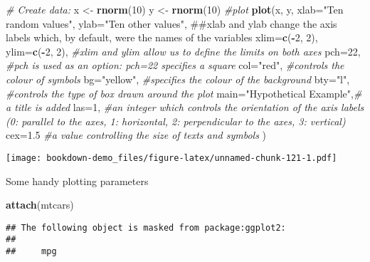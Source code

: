 \documentclass[]{book}
\newenvironment{Shaded}{\begin{snugshade}}{\end{snugshade}}
\newcommand{\KeywordTok}[1]{\textcolor[rgb]{0.13,0.29,0.53}{\textbf{#1}}}
\newcommand{\DataTypeTok}[1]{\textcolor[rgb]{0.13,0.29,0.53}{#1}}
\newcommand{\DecValTok}[1]{\textcolor[rgb]{0.00,0.00,0.81}{#1}}
\newcommand{\FloatTok}[1]{\textcolor[rgb]{0.00,0.00,0.81}{#1}}
\newcommand{\StringTok}[1]{\textcolor[rgb]{0.31,0.60,0.02}{#1}}
\newcommand{\CommentTok}[1]{\textcolor[rgb]{0.56,0.35,0.01}{\textit{#1}}}
\newcommand{\OperatorTok}[1]{\textcolor[rgb]{0.81,0.36,0.00}{\textbf{#1}}}
\newcommand{\NormalTok}[1]{#1}
\theoremstyle{definition}
\theoremstyle{definition}
\theoremstyle{definition}
\theoremstyle{remark}
\begin{document}
\begin{Shaded}
\begin{Highlighting}[]
\CommentTok{# Create data:}
\NormalTok{x <-}\StringTok{ }\KeywordTok{rnorm}\NormalTok{(}\DecValTok{10}\NormalTok{)}
\NormalTok{y <-}\StringTok{ }\KeywordTok{rnorm}\NormalTok{(}\DecValTok{10}\NormalTok{)}
\CommentTok{#plot}
\KeywordTok{plot}\NormalTok{(x, y, }\DataTypeTok{xlab=}\StringTok{"Ten random values"}\NormalTok{, }\DataTypeTok{ylab=}\StringTok{"Ten other values"}\NormalTok{, ##xlab and ylab change the axis labels which, by default, were the names of the variables}
     \DataTypeTok{xlim=}\KeywordTok{c}\NormalTok{(}\OperatorTok{-}\DecValTok{2}\NormalTok{, }\DecValTok{2}\NormalTok{), }\DataTypeTok{ylim=}\KeywordTok{c}\NormalTok{(}\OperatorTok{-}\DecValTok{2}\NormalTok{, }\DecValTok{2}\NormalTok{), }\CommentTok{#xlim and ylim allow us to define the limits on both axes}
     \DataTypeTok{pch=}\DecValTok{22}\NormalTok{,      }\CommentTok{#pch is used  as an option: pch=22 specifies a square}
     \DataTypeTok{col=}\StringTok{"red"}\NormalTok{,   }\CommentTok{#controls the colour of symbols}
     \DataTypeTok{bg=}\StringTok{"yellow"}\NormalTok{, }\CommentTok{#specifies the colour of the background}
     \DataTypeTok{bty=}\StringTok{"l"}\NormalTok{,     }\CommentTok{#controls the type of box drawn around the plot}
\DataTypeTok{main=}\StringTok{"Hypothetical Example"}\NormalTok{,}\CommentTok{# a title is added}
\DataTypeTok{las=}\DecValTok{1}\NormalTok{,   }\CommentTok{#an integer which controls the orientation of the axis labels (0: parallel to the axes, 1: horizontal, 2: perpendicular to the axes, 3: vertical)}
\DataTypeTok{cex=}\FloatTok{1.5}  \CommentTok{#a value controlling the size of texts and symbols }
\NormalTok{)}
\end{Highlighting}
\end{Shaded}

\texttt{[image: bookdown-demo\_files/figure-latex/unnamed-chunk-121-1.pdf]}

Some handy plotting parameters

\begin{Shaded}
\begin{Highlighting}[]
\KeywordTok{attach}\NormalTok{(mtcars)}
\end{Highlighting}
\end{Shaded}

\begin{verbatim}
## The following object is masked from package:ggplot2:
## 
##     mpg
\end{verbatim}
\end{document}
